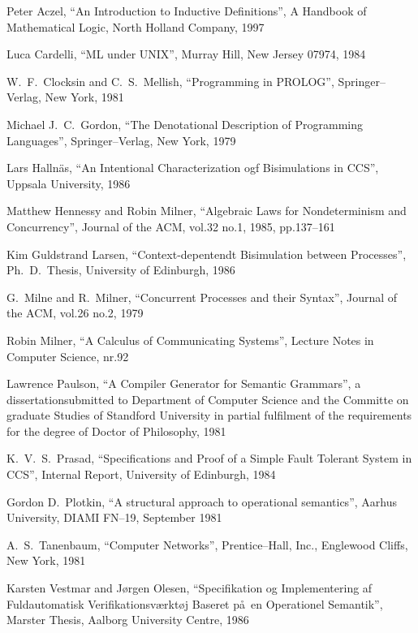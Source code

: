 \begin{thebibliography}{Clocksin,Mellish}


 Peter Aczel, ``An Introduction to Inductive Definitions'', A Handbook of Mathematical Logic, North Holland Company, 1997

 Luca Cardelli, ``ML under UNIX'', Murray Hill, New Jersey 07974, 1984

 W.~F.~Clocksin and C.~S.~Mellish, ``Programming in PROLOG'', Springer--Verlag, New York, 1981

 Michael J.~C.~Gordon, ``The Denotational Description of Programming Languages'', Springer--Verlag, New York, 1979

 Lars Halln\"as, ``An Intentional Characterization ogf Bisimulations in CCS'', Uppsala University, 1986

 Matthew Hennessy and Robin Milner, ``Algebraic Laws for Nondeterminism and Concurrency'', Journal of the ACM, vol.32 no.1, 1985, pp.137--161

 Kim Guldstrand Larsen, ``Context-depentendt Bisimulation between Processes'', Ph.~D.~Thesis, University of Edinburgh, 1986

 G.~Milne and R.~Milner, ``Concurrent Processes and their Syntax'', Journal of the ACM, vol.26 no.2, 1979

 Robin Milner, ``A Calculus of Communicating Systems'', Lecture Notes in Computer Science, nr.92

 Lawrence Paulson, ``A Compiler Generator for Semantic Grammars'', a dissertationsubmitted to Department of Computer Science and the Committe on graduate Studies of Standford University in partial fulfilment of the requirements for the degree of Doctor of Philosophy, 1981

 K.~V.~S.~Prasad, ``Specifications and Proof of a Simple Fault Tolerant System in CCS'', Internal Report, University of Edinburgh, 1984

 Gordon D.~Plotkin, ``A structural approach to operational semantics'', Aarhus University, DIAMI FN--19, September 1981

 A.~S.~Tanenbaum, ``Computer Networks'', Prentice--Hall, Inc., Englewood Cliffs, New York, 1981

 Karsten Vestmar and J\o rgen Olesen, ``Specifikation og Implementering af Fuldautomatisk Verifikationsv\ae rkt\o j Baseret p\aa\ en Operationel Semantik'', Marster Thesis, Aalborg University Centre, 1986



\end{thebibliography}


